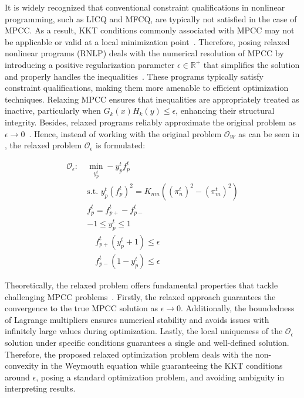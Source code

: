 It is widely recognized that conventional constraint qualifications in nonlinear programming, such as LICQ and MFCQ, are typically not satisfied in the case of MPCC. As a result, KKT conditions commonly associated with MPCC may not be applicable or valid at a local minimization point~\citep{Bouza_Still_2007}. Therefore, posing relaxed nonlinear programs (RNLP)  deals with the numerical resolution of MPCC by introducing a positive regularization parameter $\epsilon\in\mathbb{R}^+$ that simplifies the solution and properly handles the inequalities~\citep{Scholtes_2001}. These programs typically satisfy constraint qualifications, making them more amenable to efficient optimization techniques. Relaxing MPCC ensures that inequalities are appropriately treated as inactive, particularly when $G_k(x)H_k(y) \leq \epsilon$, enhancing their structural integrity. Besides, relaxed programs  reliably approximate the original problem as $\epsilon\to0$~\citep{Scheel_Scholtes_2000}. Hence, instead of working with the original problem $\mathcal{O}_W$ as can be seen in , the relaxed problem $\mathcal{O}_\epsilon$ is formulated:


\begin{subequations}
\begin{alignat}{4}
\label{eq:complementarity_relaxec1}
\mathcal{O}_\epsilon: \ &\min\limits_{y_p^t} -y_p^tf_{p}^t \\
&\text{s.t. } y_p^t(f_{p}^t)^2 = K_{nm}((\pi_{n}^t)^2-(\pi_{m}^t)^2)\\
&f_{p}^t = f_{p+}^t - f_{p-}^t\\
& -1 \leq y_p^t \leq 1 \\
&\quad f_{p+}^t(y_p^t+1) \leq \epsilon\label{eq:Oe:complementarity1} \\ \label{eq:Oe:complementarity2}
&\quad f_{p-}^t(1-y_p^t) \leq \epsilon
\end{alignat}
\end{subequations}


Theoretically, the relaxed problem offers fundamental properties that tackle challenging MPCC problems~\citep{Ralph_Wright_2004}. Firstly, the relaxed approach guarantees the convergence to the true MPCC solution as $\epsilon\to0$. Additionally, the boundedness of Lagrange multipliers ensures numerical stability and avoids issues with infinitely large values during optimization. Lastly, the local uniqueness of the $\mathcal{O}_{\epsilon}$ solution under specific conditions guarantees a single and well-defined solution. Therefore, the proposed relaxed optimization problem deals with the non-convexity in the Weymouth equation while guaranteeing the KKT conditions around $\epsilon$, posing a standard optimization problem, and avoiding ambiguity in interpreting results.

